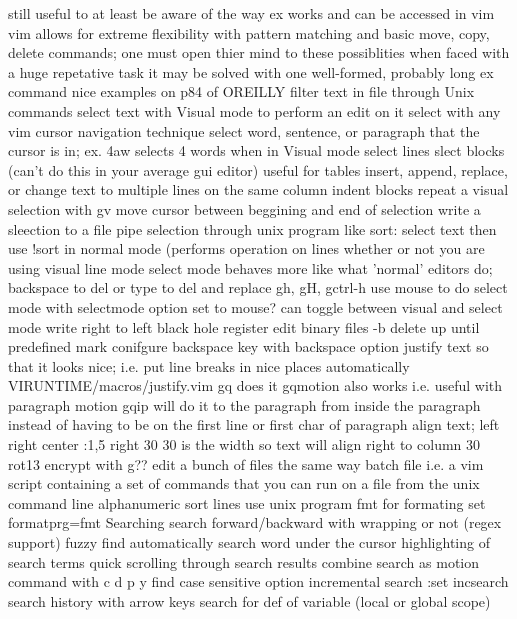 \documentclass[12pt]{book}
\begin{document}
{    still useful to at least be aware of the way ex works and can be accessed in vim
    vim allows for extreme flexibility with pattern matching and basic move, copy, delete commands; one must open thier mind to these possiblities when faced with a huge repetative task
    it may be solved with one well-formed, probably long ex command
    nice examples on p84 of OREILLY
  filter text in file through Unix commands
  select text with Visual mode to perform an edit on it
    select with any vim cursor navigation technique
    select word, sentence, or paragraph that the cursor is in; ex. 4aw selects 4 words when in Visual mode
    select lines
    slect blocks (can't do this in your average gui editor)
      useful for tables
      insert, append, replace, or change text to multiple lines on the same column
      indent blocks
    repeat a visual selection with gv
    move cursor between beggining and end of selection
    write a sleection to a file
    pipe selection through unix program like sort: select text then use !sort in normal mode (performs operation on lines whether or not you are using visual line mode
    select mode
      behaves more like what 'normal' editors do; backspace to del or type to del and replace
      gh, gH, gctrl-h
      use mouse to do select mode with selectmode option set to mouse?
      can toggle between visual and select mode
  write right to left
  black hole register
  edit binary files -b
  delete up until predefined mark
  conifgure backspace key with backspace option
  justify text so that it looks nice; i.e. put line breaks in nice places automatically
    VIRUNTIME/macros/justify.vim
    gq does it
    gqmotion also works i.e. useful with paragraph motion
    gqip will do it to the paragraph from inside the paragraph instead of having to be on the first line or first char of paragraph
  align text; left right center
    :1,5 right 30
    30 is the width so text will align right to column 30
  rot13 encrypt with g??
  edit a bunch of files the same way
    batch file i.e. a vim script containing a set of commands that you can run on a file from the unix command line
  alphanumeric sort lines
  use unix program fmt for formating
    set formatprg=fmt
Searching
  search forward/backward with wrapping or not (regex support)
  fuzzy find
  automatically search word under the cursor
  highlighting of search terms
  quick scrolling through search results
  combine search as motion command with c d p y
  find
  case sensitive option
  incremental search :set incsearch
  search history with arrow keys
  search for def of variable (local or global scope)
}
\end{document}
